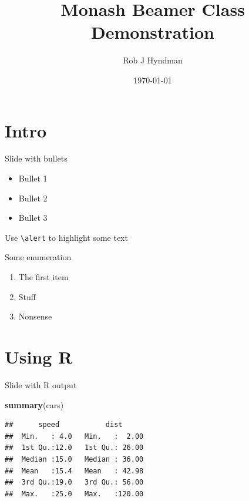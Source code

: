 \documentclass[14pt,ignorenonframetext,compress]{beamer}
\title[]{Monash Beamer Class Demonstration}
\author[
        Rob J Hyndman
    ]{Rob J Hyndman}
\date[
      \today
  ]{
      \today
        }
\newenvironment{Shaded}{\begin{snugshade}}{\end{snugshade}}
\newcommand{\KeywordTok}[1]{\textcolor[rgb]{0.13,0.29,0.53}{\textbf{#1}}}
\newcommand{\NormalTok}[1]{#1}
\providecommand{\tightlist}{%
  \setlength{\itemsep}{0pt}\setlength{\parskip}{0pt}}
\renewenvironment{Shaded}{\color{black}\begin{snugshade}\color{black}}{\end{snugshade}}
\begin{document}
  \begin{frame}[plain]
  \titlepage
  \end{frame}



\hypertarget{intro}{%
\section{Intro}\label{intro}}

\begin{frame}[fragile]{Slide with bullets}
\protect\hypertarget{slide-with-bullets}{}

\begin{itemize}
\tightlist
\item
  Bullet 1
\item
  Bullet 2
\item
  Bullet 3
\end{itemize}

Use \texttt{\textbackslash{}alert} to \alert{highlight} some text

\begin{block}{Some enumeration}

\begin{enumerate}
\tightlist
\item
  The first item
\item
  Stuff
\item
  Nonsense
\end{enumerate}

\end{block}

\end{frame}

\hypertarget{using-r}{%
\section{Using R}\label{using-r}}

\begin{frame}[fragile]{Slide with R output}
\protect\hypertarget{slide-with-r-output}{}

\begin{Shaded}
\begin{Highlighting}[]
\KeywordTok{summary}\NormalTok{(cars)}
\end{Highlighting}
\end{Shaded}

\begin{verbatim}
##      speed           dist       
##  Min.   : 4.0   Min.   :  2.00  
##  1st Qu.:12.0   1st Qu.: 26.00  
##  Median :15.0   Median : 36.00  
##  Mean   :15.4   Mean   : 42.98  
##  3rd Qu.:19.0   3rd Qu.: 56.00  
##  Max.   :25.0   Max.   :120.00
\end{verbatim}

\end{frame}
\end{document}
